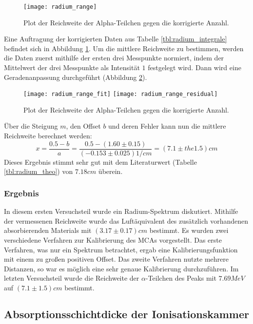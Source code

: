 \documentclass{../Misc/MontavonLaTeX/Montavon}
\newcommand{\halfwidth}{0.48\textwidth}
\newcommand{\fullwidth}{1.0\textwidth}
\begin{document}
\begin{figure}[htbp]
\centering
\texttt{[image: radium\_range]}
\caption{Plot der Reichweite der Alpha-Teilchen gegen die korrigierte Anzahl.}
\label{fig:radium_range}
\end{figure}

Eine Auftragung der korrigierten Daten aus Tabelle \ref{tbl:radium_integrale} befindet sich in Abbildung \ref{fig:radium_range}. Um die mittlere Reichweite zu bestimmen, werden die Daten zuerst mithilfe der ersten drei Messpunkte normiert, indem der Mittelwert der drei Messpunkte als Intensität $1$ festgelegt wird. Dann wird eine Geradenanpassung durchgeführt (Abbildung \ref{fig:radium_range_fit}).

\begin{figure}[htbp]
\centering
\texttt{[image: radium\_range\_fit]}
\texttt{[image: radium\_range\_residual]}
\caption{Plot der Reichweite der Alpha-Teilchen gegen die korrigierte Anzahl.}
\label{fig:radium_range_fit}
\end{figure}

Über die Steigung $m$, den Offset $b$ und deren Fehler kann nun die mittlere Reichweite berechnet werden:
\[
	x = \frac{0.5-b}{a} = \frac{0.5 - (1.60 \pm 0.15)}{(-0.153 \pm 0.025) \unit{1/cm}} = (7.1 \pm the 1.5) \unit{cm}
\]
Dieses Ergebnis stimmt sehr gut mit dem Literaturwert (Tabelle \ref{tbl:radium_theo}) von $7.18 \unit{cm}$ überein.

\subsubsection{Ergebnis}

In diesem ersten Versuchsteil wurde ein Radium-Spektrum diskutiert. Mithilfe der vermessenen Reichweite wurde das Luftäquivalent des zusätzlich vorhandenen absorbierenden Materials mit $(3.17 \pm 0.17) \unit{cm}$ bestimmt. Es wurden zwei verschiedene Verfahren zur Kalibrierung des MCAs vorgestellt. Das erste Verfahren, was nur ein Spektrum betrachtet, ergab eine Kalibrierungsfunktion mit einem zu großen positiven Offset. Das zweite Verfahren nutzte mehrere Distanzen, so war es möglich eine sehr genaue Kalibrierung durchzuführen. Im letzten Versuchsteil wurde die Reichweite der $\alpha$-Teilchen des  Peaks mit $7.69 \unit{MeV}$ auf $(7.1 \pm 1.5) \unit{cm}$ bestimmt.

\subsection{Absorptionsschichtdicke der Ionisationskammer}
\end{document}
